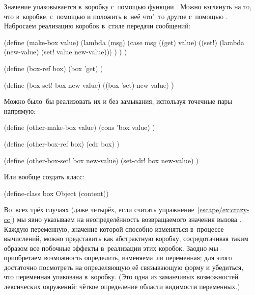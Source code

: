 Значение упаковывается в~коробку с~помощью функции . Можно
взглянуть на то, что в~коробке, с~помощью  и положить в~неё
что"~то другое с~помощью . Набросаем реализацию коробок в~стиле
передачи сообщений:

\begin{code:lisp}
(define (make-box value)
  (lambda (msg)
    (case msg
      ((get) value)
      ((set!) (lambda (new-value) (set! value new-value))) ) ) )

(define (box-ref box)
  (box 'get) )

(define (box-set! box new-value)
  ((box 'set) new-value) )
\end{code:lisp}

Можно было~бы реализовать их и без замыкания, используя точечные пары напрямую:

\begin{code:lisp}
(define (other-make-box value)
  (cons 'box value) )

(define (other-box-ref box)
  (cdr box) )

(define (other-box-set! box new-value)
  (set-cdr! box new-value) )
\end{code:lisp}

Или вообще создать класс:

\begin{code:lisp}
(define-class box Object (content))
\end{code:lisp}

Во~всех трёх случаях (даже четырёх, если считать
упражнение~\ref{escape/ex:crazy-cc}) мы явно указываем на неопределённость
возвращаемого значения вызова . Каждую переменную, значение которой
способно изменяться в~процессе вычислений, можно представить как абстрактную
коробку, сосредотачивая таким образом все побочные эффекты в~реализации этих
коробок. Заодно мы приобретаем возможность определить, изменяема~ли переменная;
для этого достаточно посмотреть на определяющую её связывающую форму и
убедиться, что переменная упакована в~коробку. (Это одна из заманчивых
возможностей лексических окружений: чёткое определение области видимости
переменных.)

